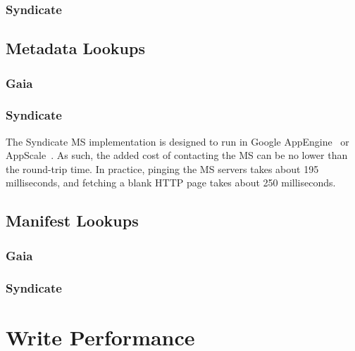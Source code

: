 \subsubsection{Syndicate}

\subsection{Metadata Lookups}

\subsubsection{Gaia}

\subsubsection{Syndicate}

The Syndicate MS implementation is designed to run in Google
AppEngine~\cite{google-appengine} or AppScale~\cite{appscale}.  As such, the
added cost of contacting the MS can be no lower than the round-trip time.
In practice, pinging the MS servers takes about 195 milliseconds, and fetching a
blank HTTP page takes about 250 milliseconds.


\subsection{Manifest Lookups}

\subsubsection{Gaia}

\subsubsection{Syndicate}




\section{Write Performance}

